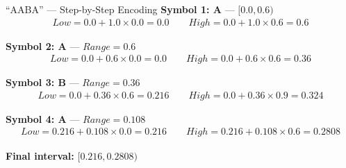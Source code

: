 \documentclass[aspectratio=169,12pt]{beamer}
\begin{document}
\begin{frame}{``AABA'' --- Step-by-Step Encoding}
    \textbf{Symbol 1: A} --- $[0.0, 0.6)$
    \begin{align*}
        Low = 0.0 + 1.0 \times 0.0 = 0.0 \qquad High = 0.0 + 1.0 \times 0.6 = 0.6
    \end{align*}
    
    \textbf{Symbol 2: A} --- $Range = 0.6$
    \begin{align*}
        Low = 0.0 + 0.6 \times 0.0 = 0.0 \qquad High = 0.0 + 0.6 \times 0.6 = 0.36
    \end{align*}
    
    \textbf{Symbol 3: B} --- $Range = 0.36$
    \begin{align*}
        Low = 0.0 + 0.36 \times 0.6 = 0.216 \qquad High = 0.0 + 0.36 \times 0.9 = 0.324
    \end{align*}
    
    \textbf{Symbol 4: A} --- $Range = 0.108$
    \begin{align*}
        Low = 0.216 + 0.108 \times 0.0 = 0.216 \qquad High = 0.216 + 0.108 \times 0.6 = 0.2808
    \end{align*}
    
    \textbf{Final interval:} $\boxed{[0.216, 0.2808)}$
\end{frame}
\end{document}
